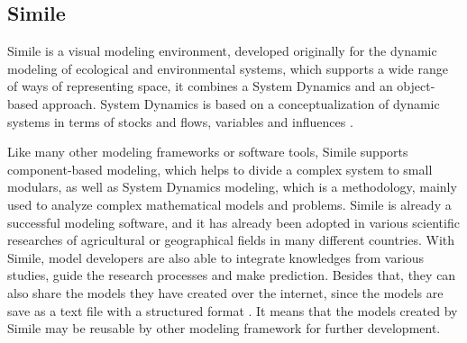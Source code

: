 \subsection{Simile}\label{sec:similie}
\par
Simile is a visual modeling environment, developed originally for the dynamic modeling of ecological and environmental systems, which supports a wide range of ways of representing space, it combines a System Dynamics and an object-based approach. System Dynamics is based on a conceptualization of dynamic systems in terms of stocks and flows, variables and influences \autocite{dsl:simile-simulistics}.
\par
Like many other modeling frameworks or software tools, Simile supports component-based modeling, which helps to divide a complex system to small modulars, as well as System Dynamics modeling, which is a methodology, mainly used to analyze complex mathematical models and problems. Simile is already a successful modeling software, and it has already been adopted in various scientific researches of agricultural or geographical fields in many different countries. With Simile, model developers are also able to integrate knowledges from various studies, guide the research processes and make prediction. Besides that, they can also share the models they have created over the internet, since the models are save as a text file with a structured format \autocite{dsl:simile-muetzelfeldt}. It means that the models created by Simile may be reusable by other modeling framework for further development.
